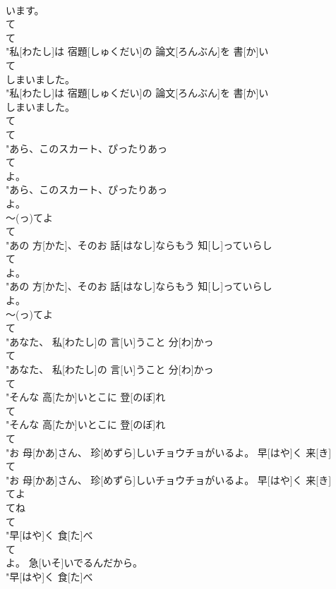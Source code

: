 \documentclass[8pt]{extreport}
\begin{document}
\begin{CJK}{UTF8}{min}
\\	います。
\\	て 
\\	て
\\	"私[わたし]は 宿題[しゅくだい]の 論文[ろんぶん]を 書[か]い
\\	て
\\	しまいました。
\\	"私[わたし]は 宿題[しゅくだい]の 論文[ろんぶん]を 書[か]い
\\	しまいました。
\\	て 
\\	て
\\	"あら、このスカート、ぴったりあっ
\\	て
\\	よ。
\\	"あら、このスカート、ぴったりあっ
\\	よ。
\\	～(っ)てよ	
\\	て
\\	"あの 方[かた]、そのお 話[はなし]ならもう 知[し]っていらし
\\	て
\\	よ。
\\	"あの 方[かた]、そのお 話[はなし]ならもう 知[し]っていらし
\\	よ。
\\	～(っ)てよ	
\\	て
\\	"あなた、 私[わたし]の 言[い]うこと 分[わ]かっ
\\	て
\\	"あなた、 私[わたし]の 言[い]うこと 分[わ]かっ
\\	て
\\	"そんな 高[たか]いとこに 登[のぼ]れ
\\	て
\\	"そんな 高[たか]いとこに 登[のぼ]れ
\\	て
\\	"お 母[かあ]さん、 珍[めずら]しいチョウチョがいるよ。 早[はや]く 来[き]
\\	て
\\	"お 母[かあ]さん、 珍[めずら]しいチョウチョがいるよ。 早[はや]く 来[き]
\\	てよ 
\\	てね 
\\	て
\\	"早[はや]く 食[た]べ
\\	て
\\	よ。 急[いそ]いでるんだから。
\\	"早[はや]く 食[た]べ

\end{CJK}
\end{document}
